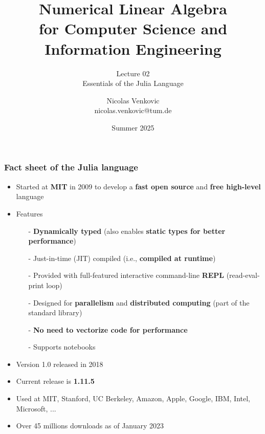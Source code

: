\documentclass[t,usepdftitle=false]{beamer}
\title[NLA for CS and IE -- Lecture 02]{Numerical Linear Algebra\\for Computer Science and Information Engineering}
\subtitle{\vspace{.3cm}Lecture 02\\Essentials of the Julia Language}
\date[Summer 2025]{Summer 2025}
\author[nicolas.venkovic@tum.de]{Nicolas Venkovic\\{\small nicolas.venkovic@tum.de}}
\institute[]{Group of Computational Mathematics\\School of Computation, Information and Technology\\Technical University of Munich}
\begin{document}
	
\begin{frame}
	\maketitle
\end{frame}
	
	
	
\begin{frame}
	\frametitle{Fact sheet of the Julia language}
	\vspace{-.15cm}
	\begin{itemize}
		\item Started at \textbf{MIT} in 2009 to develop a \textbf{fast open source} and \textbf{free high-level} language
		\item Features
		\begin{itemize}
			\item[-] \textbf{Dynamically typed} (also enables \textbf{static types for better performance})
			\item[-] Just-in-time (JIT) compiled (i.e., \textbf{compiled at runtime})
			\item[-] Provided with full-featured interactive command-line \textbf{REPL} (read-eval-print loop)
			\item[-] Designed for \textbf{parallelism} and \textbf{distributed computing} (part of the standard library)
			\item[-] \textbf{No need to vectorize code for performance}
			\item[-] Supports notebooks
		\end{itemize}
	    \item Version 1.0 released in 2018
	    \item Current release is \textbf{1.11.5}
	    \item Used at MIT, Stanford, UC Berkeley, Amazon, Apple, Google, IBM, Intel, Microsoft, ...
	    \item Over 45 millions  downloads as of January 2023
	\end{itemize}
\end{frame}
\end{document}
